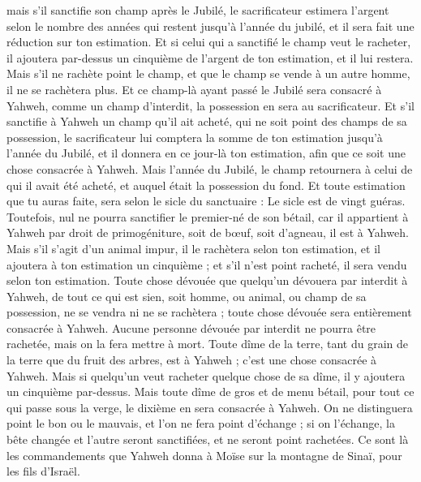 \begin{multicols}{2}
mais s'il sanctifie son champ après le Jubilé, le sacrificateur estimera l'argent selon le nombre des années qui restent jusqu'à l'année du jubilé, et il sera fait une réduction sur ton estimation.
Et si celui qui a sanctifié le champ veut le racheter, il ajoutera par-dessus un cinquième de l'argent de ton estimation, et il lui restera.
Mais s'il ne rachète point le champ, et que le champ se vende à un autre homme, il ne se rachètera plus.
Et ce champ-là ayant passé le Jubilé sera consacré à Yahweh, comme un champ d'interdit, la possession en sera au sacrificateur.
Et s'il sanctifie à Yahweh un champ qu'il ait acheté, qui ne soit point des champs de sa possession,
le sacrificateur lui comptera la somme de ton estimation jusqu'à l'année du Jubilé, et il donnera en ce jour-là ton estimation, afin que ce soit une chose consacrée à Yahweh.
Mais l'année du Jubilé, le champ retournera à celui de qui il avait été acheté, et auquel était la possession du fond.
Et toute estimation que tu auras faite, sera selon le sicle du sanctuaire : Le sicle est de vingt guéras.
Toutefois, nul ne pourra sanctifier le premier-né de son bétail, car il appartient à Yahweh par droit de primogéniture, soit de bœuf, soit d’agneau, il est à Yahweh.
Mais s'il s’agit d’un animal impur, il le rachètera selon ton estimation, et il ajoutera à ton estimation un cinquième ; et s'il n'est point racheté, il sera vendu selon ton estimation.
Toute chose dévouée que quelqu'un dévouera par interdit à Yahweh, de tout ce qui est sien, soit homme, ou animal, ou champ de sa possession, ne se vendra ni ne se rachètera ; toute chose dévouée sera entièrement consacrée à Yahweh.
Aucune personne dévouée par interdit ne pourra être rachetée, mais on la fera mettre à mort.
Toute dîme de la terre, tant du grain de la terre que du fruit des arbres, est à Yahweh ; c'est une chose consacrée à Yahweh.
Mais si quelqu'un veut racheter quelque chose de sa dîme, il y ajoutera un cinquième par-dessus.
Mais toute dîme de gros et de menu bétail, pour tout ce qui passe sous la verge, le dixième en sera consacrée à Yahweh.
On ne distinguera point le bon ou le mauvais, et l’on ne fera point d'échange ; si on l’échange, la bête changée et l'autre seront sanctifiées, et ne seront point rachetées.
Ce sont là les commandements que Yahweh donna à Moïse sur la montagne de Sinaï, pour les fils d'Israël.
\PPE{}
\end{multicols}
